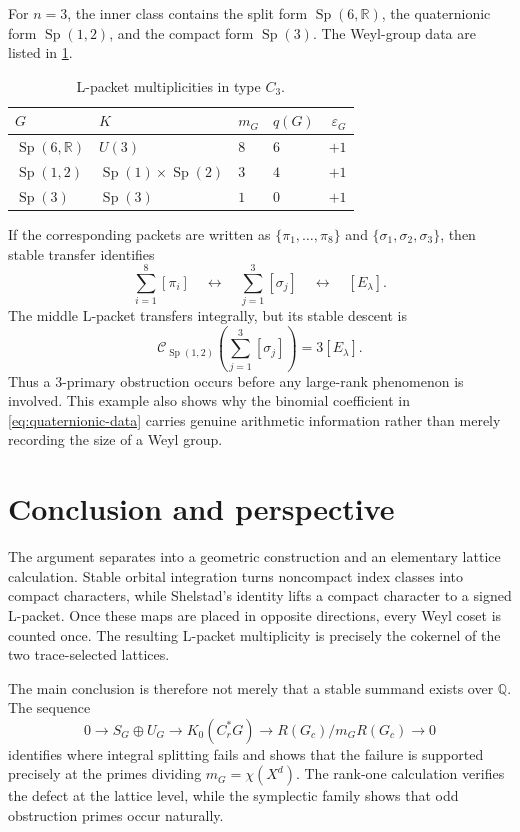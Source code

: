 \documentclass[11pt]{amsart}
\theoremstyle{definition}
\theoremstyle{remark}
\newcommand{\Q}{\mathbb Q}
\newcommand{\Cr}{C_r^*}
\newcommand{\Sp}{\operatorname{Sp}}
\begin{document}
For \(n=3\), the inner class contains the split form
\(\Sp(6,\mathbb R)\), the quaternionic form \(\Sp(1,2)\), and the compact
form \(\Sp(3)\).  The Weyl-group data are listed in \cref{tab:C3}.
\begin{table}[H]
\centering
\caption{L-packet multiplicities in type \(C_3\).}
\label{tab:C3}
\begin{tabular}{@{}llllr@{}}
\toprule
\(G\) & \(K\) & \(m_G\) & \(q(G)\) & \(\varepsilon_G\)\\
\midrule
\(\Sp(6,\mathbb R)\) & \(U(3)\) & \(8\) & \(6\) & \(+1\)\\
\(\Sp(1,2)\) & \(\Sp(1)\times\Sp(2)\) & \(3\) & \(4\) & \(+1\)\\
\(\Sp(3)\) & \(\Sp(3)\) & \(1\) & \(0\) & \(+1\)\\
\bottomrule
\end{tabular}
\end{table}
If the corresponding packets are written as
\(\{\pi_1,\ldots,\pi_8\}\) and
\(\{\sigma_1,\sigma_2,\sigma_3\}\), then stable transfer identifies
\[
  \sum_{i=1}^8[\pi_i]
  \quad\longleftrightarrow\quad
  \sum_{j=1}^3[\sigma_j]
  \quad\longleftrightarrow\quad
  [E_\lambda].
\]
The middle L-packet transfers integrally, but its stable descent is
\[
  \mathcal C_{\Sp(1,2)}
  \left(\sum_{j=1}^3[\sigma_j]\right)=3[E_\lambda].
\]
Thus a \(3\)-primary obstruction occurs before any large-rank phenomenon is
involved.  This example also shows why the binomial coefficient in
\eqref{eq:quaternionic-data} carries genuine arithmetic information rather
than merely recording the size of a Weyl group.

\section{Conclusion and perspective}\label{sec:conclusion}

The argument separates into a geometric construction and an elementary lattice calculation.  Stable orbital integration turns noncompact index classes into compact characters, while Shelstad's identity lifts a compact character to a signed L-packet.  Once these maps are placed in opposite directions, every Weyl coset is counted once.  The resulting L-packet multiplicity is precisely the cokernel of the two trace-selected lattices.

The main conclusion is therefore not merely that a stable summand exists over $\Q$.  The sequence
\[
  0\longrightarrow S_G\oplus U_G
  \longrightarrow K_0(\Cr G)
  \longrightarrow R(G_c)/m_GR(G_c)
  \longrightarrow0
\]
identifies where integral splitting fails and shows that the failure is supported precisely at the primes dividing $m_G=\chi(X^d)$.  The rank-one calculation verifies the defect at the lattice level, while the symplectic family shows that odd obstruction primes occur naturally.
\end{document}

